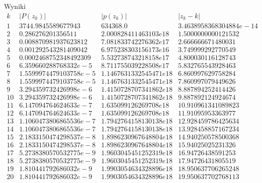 Wyniki
$$
\begin{array}{c|c|c|c|c}
k & |P(z_k)| & |p(z_k)| & |z_k - k|\\
\hline
1 & 3744.9845589677943 & 634368.0 & 3.4638958368304884e-14\\
2 & 0.286276201356511 & 2.000828411463103e18 & 1.5000000000121532\\
3 & 0.008870981937623812 & 7.081833742276362e17 & 2.666666671480031\\
4 & 0.001292543281409042 & 6.975238303156173e16 & 3.749999292770549\\
5 & 0.0002468752348492309 & 5.532738743218158e17 & 4.800030116128743\\
6 & 6.359660288768332e-5 & 8.711755039228508e17 & 5.832765543928463\\
7 & 1.5599974479103758e-5 & 1.1467631332545471e18 & 6.860997629758284\\
8 & 1.5599974479103758e-5 & 1.1467631332545471e18 & 7.860997079449626\\
9 & 3.294359732426998e-6 & 1.4150728707341862e18 & 8.887894252414426\\
10 & 3.294359732426998e-6 & 1.4150728707341862e18 & 9.887892124924674\\
11 & 6.147094764624633e-7 & 1.635099126269708e18 & 10.910961341089823\\
12 & 6.147094764624633e-7 & 1.635099126269708e18 & 11.91095953363977\\
13 & 1.1060473806865536e-7 & 1.7942764158130138e18 & 12.928459786425634\\
14 & 1.1060473806865536e-7 & 1.7942764158130138e18 & 13.928458857167234\\
15 & 2.1833150474298537e-8 & 1.8986230967648804e18 & 14.940250578500368\\
16 & 2.1833150474298537e-8 & 1.8986230967648804e18 & 15.94025025231326\\
17 & 5.2738380570532775e-9 & 1.9603045451252319e18 & 16.94726438591253\\
18 & 5.2738380570532775e-9 & 1.9603045451252319e18 & 17.94726431805519\\
19 & 1.810441792686032e-9 & 1.9903054634328896e18 & 18.950637706265248\\
20 & 1.810441792686032e-9 & 1.9903054634328896e18 & 19.950637702768113\\
\end{array}
$$
